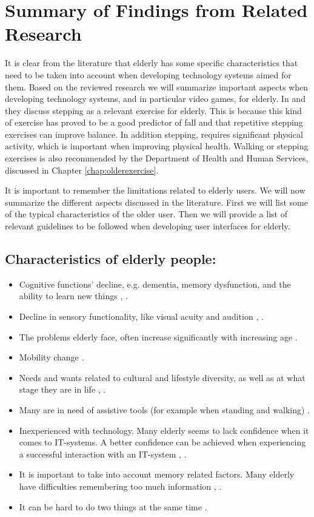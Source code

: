\section{Summary of Findings from Related Research}
\label{sec:summaryguidelines}
It is clear from the literature that elderly has some specific characteristics that need to be taken into account when developing technology systems aimed for them. Based on the reviewed research we will summarize important aspects when developing technology systems, and in particular video games, for elderly. In \cite{bruin} and \cite{gerling2} they discuss stepping as a relevant exercise for elderly. This is because this kind of exercise has proved to be a good predictor of fall and that repetitive stepping exercises can improve balance. In addition stepping, requires significant physical activity, which is important when improving physical health. Walking or stepping exercises is also recommended by the Department of Health and Human Services, discussed in Chapter \ref{chap:olderexercise}.

It is important to remember the limitations related to elderly users. We will now summarize the different aspects discussed in the literature. First we will list some of the typical characteristics of the older user. Then we will provide a list of relevant guidelines to be followed when developing user interfaces for elderly. 

\subsection{Characteristics of elderly people:}
\label{subsec:characteristics}
\begin{itemize}
\renewcommand{\labelitemi}{$\bullet$}
\item Cognitive functions' decline, e.g. dementia, memory dysfunction, and the ability to learn new things \cite{Billis}, \cite{gregor}.
\item Decline in sensory functionality, like  visual acuity and audition \cite{Billis}, \cite{gregor}.
\item The problems elderly face, often increase significantly with increasing age \cite{gregor}.
\item Mobility change \cite{Billis}.
\item Needs and wants related to cultural and lifestyle diversity, as well as at what stage they are in life \cite{Billis}, \cite{gregor}.
\item Many are in need of assistive tools (for example when standing and walking) \cite{gregor}.
\item Inexperienced with technology. Many elderly seems to lack confidence when it comes to IT-systems. A better confidence can be achieved when experiencing a successful interaction with an IT-system \cite{Billis}, \cite{gregor}.
\item It is important to take into account memory related factors. Many elderly have difficulties remembering too much information \cite{Billis}, \cite{gregor}.
\item It can be hard to do two things at the same time \cite{bruin}.
\end{itemize}

